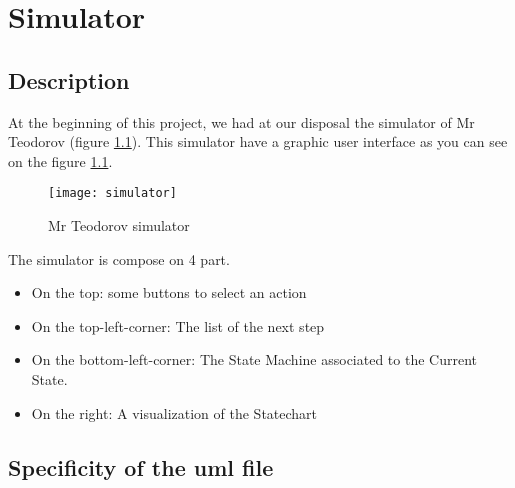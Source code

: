 
\chapter{Simulator}
\label{chap:simulator}
\section{Description}


At the beginning of this project, we had at our disposal the simulator of Mr Teodorov (figure \ref{fig:sim}). This simulator have a graphic user interface as you can see on the figure \ref{fig:sim}.


\begin{figure}[h]
  \centering
  \texttt{[image: simulator]}
  \caption{Mr Teodorov simulator}
  \label{fig:sim}
\end{figure}


The simulator is compose on 4 part.
\begin{itemize}
\item On the top: some buttons to select an action
\item On the top-left-corner: The list of the next step
\item On the bottom-left-corner: The State Machine associated to the Current State.
\item On the right: A visualization of the Statechart
\end{itemize}

\section{Specificity of the uml file}






